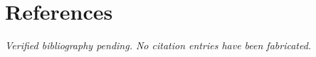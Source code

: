 \documentclass[10pt,twocolumn,letterpaper]{article}
\begin{document}
\maketitle









\ifhasverifiedreferences
{\small

}
\else
\section*{References}
\textit{Verified bibliography pending. No citation entries have been fabricated.}
\fi
\end{document}
